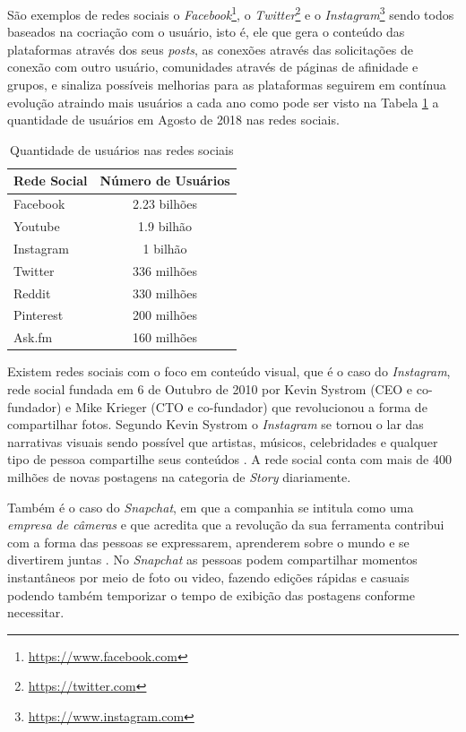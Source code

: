 São exemplos de redes sociais o \textit{Facebook}\footnote{\url{https://www.facebook.com}}, o \textit{Twitter}\footnote{\url{https://twitter.com}} e o \textit{Instagram}\footnote{\url{https://www.instagram.com}} sendo todos baseados na cocriação com o usuário, isto é, ele que gera o conteúdo das plataformas através dos seus \textit{posts}, as conexões através das solicitações de conexão com outro usuário, comunidades através de páginas de afinidade e grupos, e sinaliza possíveis melhorias para as plataformas seguirem em contínua evolução atraindo mais usuários a cada ano como pode ser visto na Tabela \ref{tab:qtdusers} a quantidade de usuários em Agosto de 2018 nas redes sociais.


\begin{table}[h]
\centering
\caption{Quantidade de usuários nas redes sociais}
\label{tab:qtdusers}
\begin{tabular}{|l|c|}
\hline
\textbf{Rede Social}&  \textbf{Número de Usuários} \\ \hline
Facebook     &     2.23 bilhões   \\ \hline
Youtube      &     1.9  bilhão    \\ \hline
Instagram    &     1    bilhão    \\ \hline
Twitter      &     336  milhões   \\ \hline
Reddit       &     330  milhões    \\ \hline
Pinterest    &     200  milhões    \\ \hline
Ask.fm       &     160  milhões    \\ \hline
\end{tabular}
\end{table}

Existem redes sociais com o foco em conteúdo visual, que é o caso do \textit{Instagram}, rede social fundada em 6 de Outubro de 2010 por Kevin Systrom (CEO e co-fundador) e Mike Krieger (CTO e co-fundador) que revolucionou a forma de compartilhar fotos. Segundo Kevin Systrom o \textit{Instagram} se tornou o lar das narrativas visuais sendo possível que artistas, músicos, celebridades e qualquer tipo de pessoa compartilhe seus conteúdos \cite{instagram_2018}. A rede social conta com mais de 400 milhões de novas postagens na categoria de \textit{Story} diariamente. 

Também é o caso do \textit{Snapchat}, em que a companhia se intitula como uma \textit{empresa de câmeras} e que acredita que a revolução da sua ferramenta contribui com a forma das pessoas se expressarem, aprenderem sobre o mundo e se divertirem juntas \cite{snapchat_2018}. No \textit{Snapchat} as pessoas podem compartilhar momentos instantâneos por meio de foto ou video, fazendo edições rápidas e casuais podendo também temporizar o tempo de exibição das postagens conforme necessitar.

